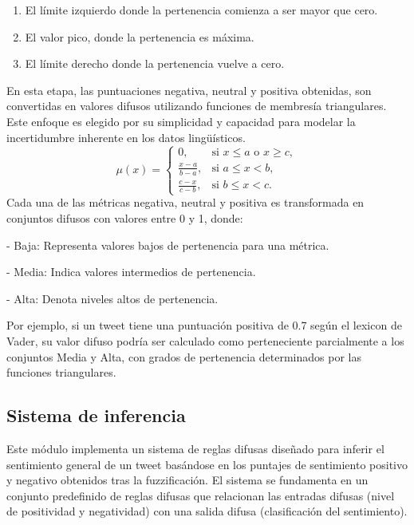 \documentclass[sigconf, review=false, nonacm]{acmart}
\begin{document}
\begin{enumerate}
	\item El límite izquierdo donde la pertenencia comienza a ser mayor que cero.
	\item El valor pico, donde la pertenencia es máxima.
	\item El límite derecho donde la pertenencia vuelve a cero.
\end{enumerate}

En esta etapa, las puntuaciones negativa, neutral y positiva obtenidas, son convertidas en valores difusos
utilizando funciones de membresía triangulares. Este enfoque es elegido por su simplicidad y capacidad para
modelar la incertidumbre inherente en los datos lingüísticos.
$$
	\mu(x) =
	\begin{cases}
		0,                   & \text{si } x \leq a \text{ o } x \geq c, \\
		\frac{x - a}{b - a}, & \text{si } a \leq x < b,                 \\
		\frac{c - x}{c - b}, & \text{si } b \leq x < c.
	\end{cases}
$$
Cada una de las métricas negativa, neutral y positiva es transformada en conjuntos difusos con valores
entre 0 y 1, donde:

- Baja: Representa valores bajos de pertenencia para una métrica.

- Media: Indica valores intermedios de pertenencia.

- Alta: Denota niveles altos de pertenencia.

Por ejemplo, si un tweet tiene una puntuación positiva de 0.7 según el lexicon de Vader,
su valor difuso podría ser calculado como perteneciente parcialmente a los conjuntos Media y Alta,
con grados de pertenencia determinados por las funciones triangulares.

\subsection{Sistema de inferencia}
Este módulo implementa un sistema de reglas difusas diseñado para inferir el sentimiento general de un
tweet basándose en los puntajes de sentimiento positivo y negativo obtenidos tras la fuzzificación.
El sistema se fundamenta en un conjunto predefinido de reglas difusas que relacionan las entradas
difusas (nivel de positividad y negatividad) con una salida difusa (clasificación del sentimiento).
\end{document}
